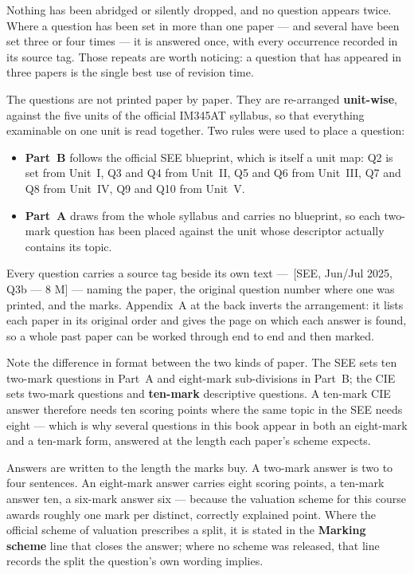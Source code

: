 \documentclass[11pt,a4paper,oneside]{book}
\newcommand{\src}[1]{{\footnotesize\sffamily\color{ocre}\,[#1]}}
\newenvironment{abul}
  {\begin{itemize}[leftmargin=1.5em,itemsep=1.5pt,topsep=3pt,parsep=0pt,
                   label=\textcolor{ocre}{\scriptsize$\blacksquare$}]}
  {\end{itemize}}
\begin{document}
Nothing has been abridged or silently dropped, and no question appears twice.
Where a question has been set in more than one paper --- and several have been
set three or four times --- it is answered once, with every occurrence recorded
in its source tag. Those repeats are worth noticing: a question that has
appeared in three papers is the single best use of revision time.

\vspace{4pt}
The questions are not printed paper by paper. They are re-arranged
\textbf{unit-wise}, against the five units of the official IM345AT syllabus, so
that everything examinable on one unit is read together. Two rules were used to
place a question:

\begin{abul}
\item \textbf{Part~B} follows the official SEE blueprint, which is itself a
      unit map: Q2 is set from Unit~I, Q3 and Q4 from Unit~II, Q5 and Q6 from
      Unit~III, Q7 and Q8 from Unit~IV, Q9 and Q10 from Unit~V.
\item \textbf{Part~A} draws from the whole syllabus and carries no blueprint,
      so each two-mark question has been placed against the unit whose
      descriptor actually contains its topic.
\end{abul}

Every question carries a source tag beside its own text ---
\src{SEE, Jun/Jul 2025, Q3b --- 8 M} --- naming the paper, the original
question number where one was printed, and the marks. Appendix~A at the back
inverts the arrangement: it lists each paper in its original order and gives the
page on which each answer is found, so a whole past paper can be worked through
end to end and then marked.

\vspace{4pt}
Note the difference in format between the two kinds of paper. The SEE sets
ten two-mark questions in Part~A and eight-mark sub-divisions in Part~B; the CIE
sets two-mark questions and \textbf{ten-mark} descriptive questions. A ten-mark
CIE answer therefore needs ten scoring points where the same topic in the SEE
needs eight --- which is why several questions in this book appear in both an
eight-mark and a ten-mark form, answered at the length each paper's scheme
expects.

\vspace{4pt}
Answers are written to the length the marks buy. A two-mark answer is two to
four sentences. An eight-mark answer carries eight scoring points, a ten-mark
answer ten, a six-mark answer six --- because the valuation scheme for this
course awards roughly one mark per distinct, correctly explained point. Where
the official scheme of valuation prescribes a split, it is stated in the
\textbf{\color{ocre}Marking scheme} line that closes the answer; where no scheme
was released, that line records the split the question's own wording implies.
\end{document}

